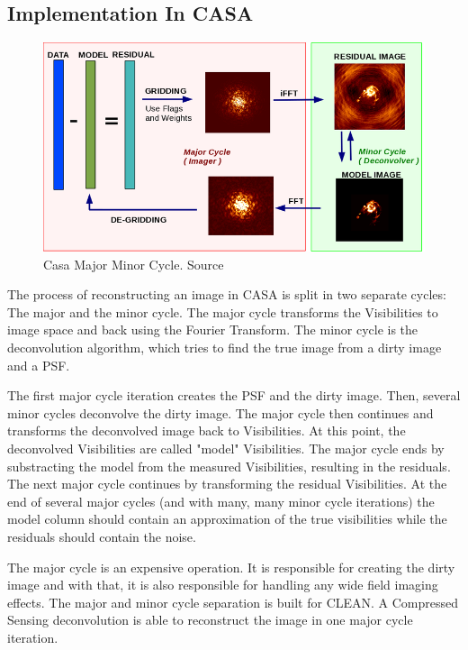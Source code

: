 \subsection{Implementation In CASA}

\begin{figure}
	\centering
	\vspace{-15pt}
	\includegraphics[width=0.9\linewidth]{./chapters/04.cs/img/casa_major_minor.png}
	\caption{Casa Major Minor Cycle. Source \cite{casa2018major}}
	\label{cs:major}
	\vspace{-10pt}
\end{figure}

The process of reconstructing an image in CASA is split in two separate cycles: The major and the minor cycle. The major cycle transforms the Visibilities to image space and back using the Fourier Transform. The minor cycle is the deconvolution algorithm, which tries to find the true image from a dirty image and a PSF. 

The first major cycle iteration creates the PSF and the dirty image. Then, several minor cycles deconvolve the dirty image. The major cycle then continues and transforms the deconvolved image back to Visibilities. At this point, the deconvolved Visibilities are called "model" Visibilities. The major cycle ends by substracting the model from the measured Visibilities, resulting in the residuals. The next major cycle continues by transforming the residual Visibilities. At the end of several major cycles (and with many, many minor cycle iterations) the model column should contain an approximation of the true visibilities while the residuals should contain the noise. 
 
The major cycle is an expensive operation. It is responsible for creating the dirty image and with that, it is also responsible for handling any wide field imaging effects. The major and minor cycle separation is built for CLEAN. A Compressed Sensing deconvolution is able to reconstruct the image in one major cycle iteration. 

